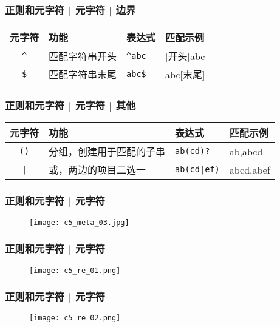 \begin{frame}[fragile]
  \frametitle{正则和元字符 | 元字符 | \alert{边界}}
  \begin{table}
    \centering
    \begin{tabularx}{\textwidth}{cXll}
      \hline
      \rowcolor{blue!50}元字符 & 功能 & 表达式 & 匹配示例\\
      \hline
      \verb|^| & 匹配字符串开头 & \verb|^abc| & [开头]abc\\
      \verb|$| & 匹配字符串末尾 & \verb|abc$| & abc[末尾]\\
      \hline
    \end{tabularx}
  \end{table}
\end{frame}

\begin{frame}[fragile]
  \frametitle{正则和元字符 | 元字符 | \alert{其他}}
  \begin{table}
    \centering
    \begin{tabularx}{\textwidth}{cXll}
      \hline
      \rowcolor{blue!50}元字符 & 功能 & 表达式 & 匹配示例\\
      \hline
      \verb|()| & 分组，创建用于匹配的子串 & \verb|ab(cd)?| & ab,abcd\\
      \verb=|= & 或，两边的项目二选一 & \verb=ab(cd|ef)= & abcd,abef\\
      \hline
    \end{tabularx}
  \end{table}
\end{frame}

\begin{frame}
  \frametitle{正则和元字符 | 元字符}
  \begin{figure}
    \centering
    \texttt{[image: c5\_meta\_03.jpg]}
  \end{figure}
\end{frame}

\begin{frame}
  \frametitle{正则和元字符 | 元字符}
  \begin{figure}
    \centering
    \texttt{[image: c5\_re\_01.png]}
  \end{figure}
\end{frame}

\begin{frame}
  \frametitle{正则和元字符 | 元字符}
  \begin{figure}
    \centering
    \texttt{[image: c5\_re\_02.png]}
  \end{figure}
\end{frame}


